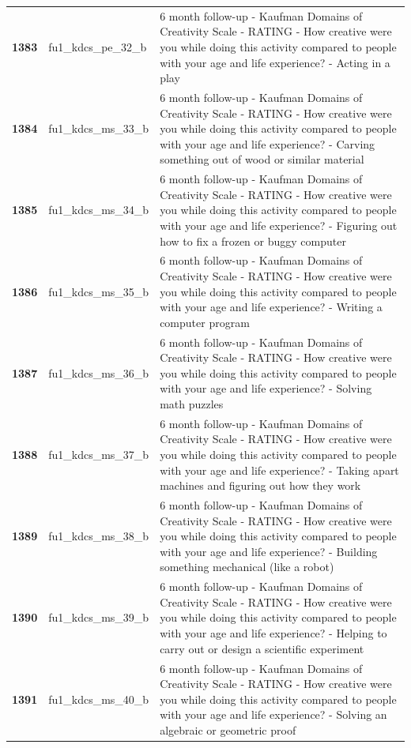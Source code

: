 \documentclass[
  letterpaper,
  DIV=11,
  numbers=noendperiod]{scrartcl}
\begin{document}
\begin{longtable}[t]{>{}cll}
\textbf{1383} & fu1\_kdcs\_pe\_32\_b & 6 month follow-up - Kaufman Domains of Creativity Scale - RATING - How creative were you while doing this activity compared to people with your age and life experience? - Acting in a play\\
\textbf{1384} & fu1\_kdcs\_ms\_33\_b & 6 month follow-up - Kaufman Domains of Creativity Scale - RATING - How creative were you while doing this activity compared to people with your age and life experience? - Carving something out of wood or similar material\\
\textbf{1385} & fu1\_kdcs\_ms\_34\_b & 6 month follow-up - Kaufman Domains of Creativity Scale - RATING - How creative were you while doing this activity compared to people with your age and life experience? - Figuring out how to fix a frozen or buggy computer\\
\addlinespace
\textbf{1386} & fu1\_kdcs\_ms\_35\_b & 6 month follow-up - Kaufman Domains of Creativity Scale - RATING - How creative were you while doing this activity compared to people with your age and life experience? - Writing a computer program\\
\textbf{1387} & fu1\_kdcs\_ms\_36\_b & 6 month follow-up - Kaufman Domains of Creativity Scale - RATING - How creative were you while doing this activity compared to people with your age and life experience? - Solving math puzzles\\
\textbf{1388} & fu1\_kdcs\_ms\_37\_b & 6 month follow-up - Kaufman Domains of Creativity Scale - RATING - How creative were you while doing this activity compared to people with your age and life experience? - Taking apart machines and figuring out how they work\\
\textbf{1389} & fu1\_kdcs\_ms\_38\_b & 6 month follow-up - Kaufman Domains of Creativity Scale - RATING - How creative were you while doing this activity compared to people with your age and life experience? - Building something mechanical (like a robot)\\
\textbf{1390} & fu1\_kdcs\_ms\_39\_b & 6 month follow-up - Kaufman Domains of Creativity Scale - RATING - How creative were you while doing this activity compared to people with your age and life experience? - Helping to carry out or design a scientific experiment\\
\addlinespace
\textbf{1391} & fu1\_kdcs\_ms\_40\_b & 6 month follow-up - Kaufman Domains of Creativity Scale - RATING - How creative were you while doing this activity compared to people with your age and life experience? - Solving an algebraic or geometric proof\\

\end{longtable}
\end{document}
